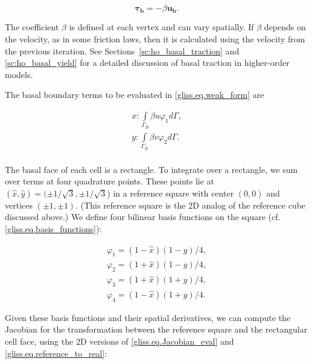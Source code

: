 \begin{equation}
  \label{gliss.eq.beta_tau}
  \mathbf{\tau_b} = -\beta \mathbf{u_b}.  
\end{equation}

\noindent
The coefficient $\beta$ is defined at each vertex and can vary spatially.  
If $\beta$ depends on the velocity, as in some friction laws,
then it is calculated using the velocity from the previous iteration.
See Sections~\ref{sc:ho_basal_traction} and \ref{sc:ho_basal_yield}
for a detailed discussion of basal traction in higher-order models.

The basal boundary terms to be evaluated in \eqref{gliss.eq.weak_form} are

\begin{equation}
  \label{gliss.eq.basal_bc}
  \begin{split}
    x: \int\limits_{{\Gamma }_{B}} \beta u{{\varphi }_{1}} d\Gamma , \\
    y: \int\limits_{{\Gamma }_{B}} \beta v{{\varphi }_{2}} d\Gamma . \\
  \end{split}
\end{equation}

\noindent
The basal face of each cell is a rectangle. To integrate over a rectangle, we 
sum over terms at four quadrature points.  These points lie at $(\hat{x},\hat{y}) = (\pm 1/\sqrt{3}, \pm 1/\sqrt{3}$)
in a reference square with center $(0,0)$ and vertices $(\pm1,\pm1)$.
(This reference square is the 2D analog of the reference cube discussed above.)
We define four bilinear basis functions on the square (cf. \eqref{gliss.eq.basis_functions}):

\begin{equation}
  \label{gliss.eq.basis_functions_2d}
  \begin{matrix}
    {{\varphi }_{1}}=(1-\hat{x})(1-\hat{y})/4,  \\[3pt]
    {{\varphi }_{2}}=(1+\hat{x})(1-\hat{y})/4,  \\[3pt]
    {{\varphi }_{3}}=(1+\hat{x})(1+\hat{y})/4,  \\[3pt]
    {{\varphi }_{4}}=(1-\hat{x})(1+\hat{y})/4.
  \end{matrix}
\end{equation}

\noindent
Given these basis functions and their spatial derivatives, we can compute the Jacobian
for the transformation between the reference square and the rectangular cell face,
using the 2D versions of \eqref{gliss.eq.Jacobian_eval} and \eqref{gliss.eq.reference_to_real}:

